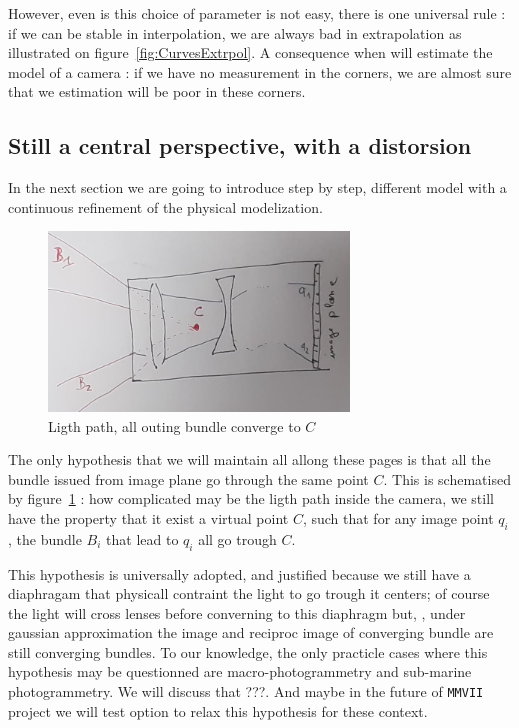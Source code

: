 However, even is this choice of parameter is not easy, there is
one universal rule : if we can be stable in interpolation, we are always bad in extrapolation
as illustrated on figure~\ref{fig:CurvesExtrpol}. A 
consequence when will estimate the model of a camera : if we have no measurement in the corners,
we are almost sure that we estimation will be poor in these corners.

\subsection{Still a central perspective, with a distorsion}
\label{Still:Persp}

In the next section we are going to introduce step by step, different model with a continuous
refinement of the physical modelization.  

\begin{figure}
\centering
	\includegraphics[width=8cm]{Methods/Images/CamPersp.jpg}
	\caption{Ligth path, all outing bundle converge to $C$}
	\label{fig:CamPerspScheme}
\end{figure}

The only hypothesis that we will maintain all allong these pages is that all the bundle issued from image
plane go through the same point $C$. This is schematised by figure~\ref{fig:CamPerspScheme} :
how complicated may be the ligth path inside the camera, we still have the property that
it exist a virtual point $C$, such that for any image point $q_i$, the bundle $B_i$ that lead to $q_i$
all go trough $C$.

This hypothesis is universally adopted, and justified because we still have a diaphragam that physicall contraint
the light to go trough it centers; of course the light will cross lenses before converning to this diaphragm but, 
, under gaussian approximation the image and reciproc image of converging bundle are still converging bundles.
To our knowledge, the only practicle cases where this hypothesis may be questionned are macro-photogrammetry and
sub-marine photogrammetry. We will discuss that ???. And maybe in the future of {\tt MMVII} project we will 
test option to relax this hypothesis for these context.

